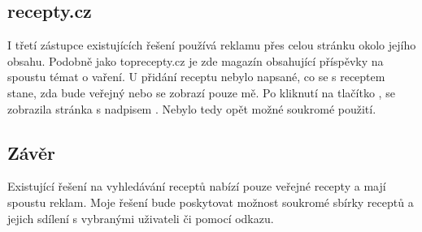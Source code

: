 \subsection{recepty.cz}

I třetí zástupce existujících řešení používá reklamu přes celou stránku okolo jejího obsahu. Podobně jako toprecepty.cz
je zde magazín obsahující příspěvky na spoustu témat o vaření. U přidání receptu nebylo napsané, co se s receptem stane,
zda bude veřejný nebo se zobrazí pouze mě. Po kliknutí na tlačítko , se zobrazila stránka s nadpisem
. Nebylo tedy opět možné soukromé použití.

\subsection{Závěr}

Existující řešení na vyhledávání receptů nabízí pouze veřejné recepty a mají spoustu reklam. Moje řešení bude poskytovat
možnost soukromé sbírky receptů a jejich sdílení s vybranými uživateli či pomocí odkazu.
